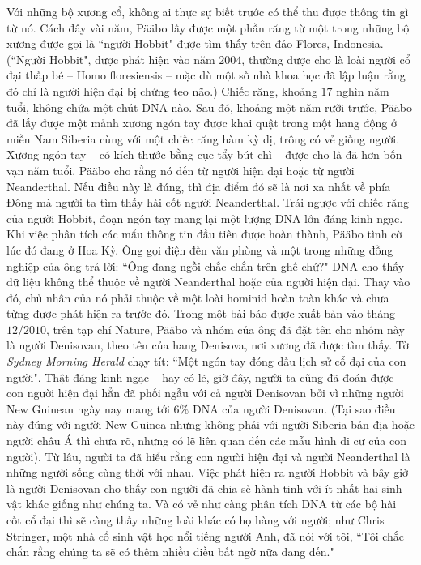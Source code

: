\begin{multicols}{2}
	\vskip 0.1cm
	Với những bộ xương cổ, không ai thực sự biết trước có thể thu được thông tin gì từ nó. Cách đây vài năm, Pääbo lấy được một phần răng từ một trong những bộ xương được gọi là ``người Hobbit" được tìm thấy trên đảo Flores, Indonesia. (``Người Hobbit", được phát hiện vào năm $2004$, thường được cho là loài người cổ đại thấp bé -- Homo floresiensis -- mặc dù một số nhà khoa học đã lập luận rằng đó chỉ là người hiện đại bị chứng teo não.) Chiếc răng, khoảng $17$ nghìn năm tuổi, không chứa một chút DNA nào.
	\vskip 0.1cm
	Sau đó, khoảng một năm rưỡi trước, Pääbo đã lấy được một mảnh xương ngón tay được khai quật trong một hang động ở miền Nam Siberia cùng với một chiếc răng hàm kỳ dị, trông có vẻ giống người. Xương ngón tay -- có kích thước bằng cục tẩy bút chì -- được cho là đã hơn bốn vạn năm tuổi. Pääbo cho rằng nó đến từ người hiện đại hoặc từ người Neanderthal. Nếu điều này là đúng, thì địa điểm đó sẽ là nơi xa nhất về phía Đông mà người ta tìm thấy hài cốt người Neanderthal.
	\vskip 0.1cm
	Trái ngược với chiếc răng của người Hobbit, đoạn ngón tay mang lại một lượng DNA lớn đáng kinh ngạc. Khi việc phân tích các mẩu thông tin đầu tiên được hoàn thành, Pääbo tình cờ lúc đó đang ở Hoa Kỳ. Ông gọi điện đến văn phòng và một trong những đồng nghiệp của ông trả lời: ``Ông đang ngồi chắc chắn trên ghế chứ?" DNA cho thấy dữ liệu không thể thuộc về người Neanderthal hoặc của người hiện đại. Thay vào đó, chủ nhân của nó phải thuộc về một loài hominid hoàn toàn khác và chưa từng được phát hiện ra trước đó. Trong một bài báo được xuất bản vào tháng $12/2010$, trên tạp chí Nature, Pääbo và nhóm của ông đã đặt tên cho nhóm này là người Denisovan, theo tên của hang Denisova, nơi xương đã được tìm thấy. Tờ \textit{Sydney Morning Herald} chạy tít: ``Một ngón tay đóng dấu lịch sử cổ đại của con người". Thật đáng kinh ngạc -- hay có lẽ, giờ đây, người ta cũng đã đoán được -- con người hiện đại hẳn đã phối ngẫu với cả người Denisovan bởi vì những người New Guinean ngày nay mang tới $6\%$ DNA của người Denisovan. (Tại sao điều này đúng với người New Guinea nhưng không phải với người Siberia bản địa hoặc người châu Á thì chưa rõ, nhưng có lẽ liên quan đến các mẫu hình di cư của con người).
	\vskip 0.1cm
	Từ lâu, người ta đã hiểu rằng con người hiện đại và người Neanderthal là những người sống cùng thời với nhau. Việc phát hiện ra người Hobbit và bây giờ là người Denisovan cho thấy con người đã chia sẻ hành tinh với ít nhất hai sinh vật khác giống như chúng ta. Và có vẻ như càng phân tích DNA từ các bộ hài cốt cổ đại thì sẽ càng thấy những loài khác có họ hàng với người; như Chris Stringer, một nhà cổ sinh vật học nổi tiếng người Anh, đã nói với tôi, ``Tôi chắc chắn rằng chúng ta sẽ có thêm nhiều điều bất ngờ nữa đang đến."

\end{multicols}
